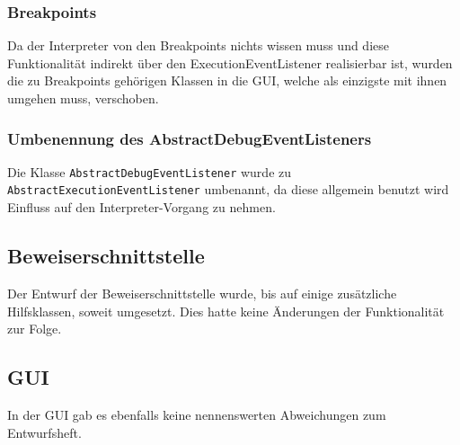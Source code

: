 \subsubsection{Breakpoints}
Da der Interpreter von den Breakpoints nichts wissen muss und diese Funktionalität indirekt über den ExecutionEventListener realisierbar ist, wurden die zu Breakpoints gehörigen Klassen in die GUI, welche als einzigste mit ihnen umgehen muss, verschoben. 

\subsubsection{Umbenennung des AbstractDebugEventListeners}
Die Klasse \texttt{AbstractDebugEventListener} wurde zu \texttt{AbstractExecutionEventListener} umbenannt, da diese allgemein benutzt wird Einfluss auf den Interpreter-Vorgang zu nehmen.

\subsection{Beweiserschnittstelle}
Der Entwurf der Beweiserschnittstelle wurde, bis auf einige zusätzliche Hilfsklassen, soweit umgesetzt. Dies hatte keine Änderungen der Funktionalität zur Folge.

\subsection{GUI}
In der GUI gab es ebenfalls keine nennenswerten Abweichungen zum Entwurfsheft.
